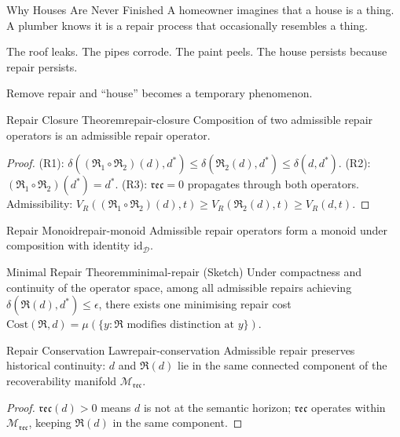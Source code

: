 \documentclass[12pt,twoside,openright]{book}
\newcommand{\repair}{\mathfrak{R}}
\newcommand{\reco}{\mathfrak{rec}}
\begin{document}
\begin{distinctionaside}{Why Houses Are Never Finished}
A homeowner imagines that a house is a thing. A plumber
knows it is a repair process that occasionally resembles a
thing.

The roof leaks. The pipes corrode. The paint peels. The
house persists because repair persists.

Remove repair and ``house'' becomes a temporary phenomenon.
\end{distinctionaside}

\begin{theorem}{Repair Closure Theorem}{repair-closure}
  Composition of two admissible repair operators is an
  admissible repair operator.
\end{theorem}
\begin{proof}
  (R1): $\delta((\repair_1\circ\repair_2)(d),d^*)
  \le\delta(\repair_2(d),d^*)\le\delta(d,d^*)$.
  (R2): $(\repair_1\circ\repair_2)(d^*)=d^*$.
  (R3): $\reco=0$ propagates through both operators.
  Admissibility: $V_R((\repair_1\circ\repair_2)(d),t)
  \ge V_R(\repair_2(d),t)\ge V_R(d,t)$.
\end{proof}

\begin{corollary}{Repair Monoid}{repair-monoid}
  Admissible repair operators form a monoid under
  composition with identity $\mathrm{id}_\mathcal{D}$.
\end{corollary}

\begin{theorem}{Minimal Repair Theorem}{minimal-repair}
  \textup{(Sketch)} Under compactness and continuity of
  the operator space, among all admissible repairs
  achieving $\delta(\repair(d),d^*)\le\epsilon$,
  there exists one minimising repair cost
  $\mathrm{Cost}(\repair,d)=
  \mu(\{y:\repair\text{ modifies distinction at }y\})$.
\end{theorem}

\begin{theorem}{Repair Conservation Law}{repair-conservation}
  Admissible repair preserves historical continuity:
  $d$ and $\repair(d)$ lie in the same connected
  component of the recoverability manifold
  $\mathcal{M}_\reco$.
\end{theorem}
\begin{proof}
  $\reco(d)>0$ means $d$ is not at the semantic horizon;
  $\mathfrak{rec}$ operates within $\mathcal{M}_\reco$,
  keeping $\repair(d)$ in the same component.
\end{proof}
\end{document}
